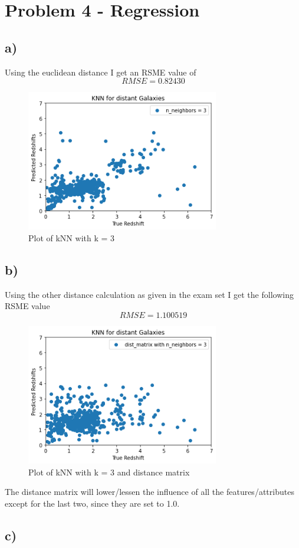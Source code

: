 \section{Problem 4 - Regression}
\subsection{a)}
Using the euclidean distance I get an RSME value of
$$RMSE = 0.82430$$
\begin{figure}[H]
    \centering
    \includegraphics[width=0.75\textwidth]{Figures/Q4_a_galaxiesPlot.png}
    \caption{Plot of kNN with k = 3}
\end{figure}

\subsection{b)}
Using the other distance calculation as given in the exam set I get the following RSME value
$$RMSE = 1.100519$$
\begin{figure}[H]
    \centering
    \includegraphics[width=0.75\textwidth]{Figures/Q4_b_wMatrix_plot.png}
    \caption{Plot of kNN with k = 3 and distance matrix}
\end{figure}

The distance matrix will lower/lessen the influence of all 
the features/attributes except for the last two, since they are set to 1.0.
\subsection{c)}
\newpage